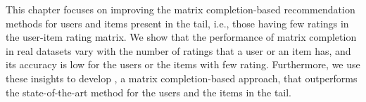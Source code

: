 This chapter focuses on improving the matrix completion-based 
recommendation methods for users and items present in 
the tail, i.e., those having few ratings in the user-item rating matrix.
We show that the performance of matrix completion in real datasets
vary with the number of ratings that a user or an item has, and its accuracy is
 low for the users or the items with few rating.  
Furthermore, we use these insights to develop \emph{\TMF},
a matrix completion-based approach, that outperforms the 
state-of-the-art \MF method for the users and the items 
in the tail.